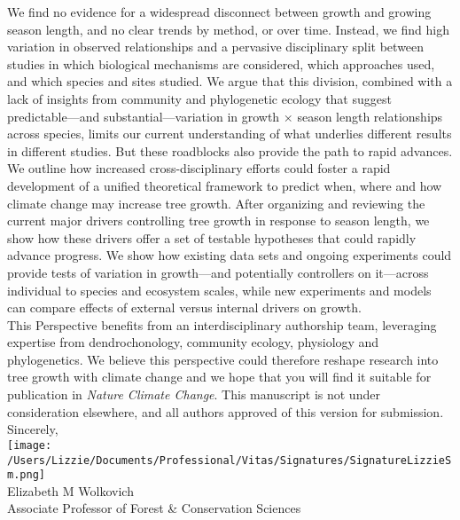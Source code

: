 \documentclass[11pt,a4paper]{article}
\begin{document}
We find no evidence for a widespread disconnect between growth and growing season length, and no clear trends by method, or over time. Instead, we find high variation in observed relationships and a pervasive disciplinary split between studies in which biological mechanisms are considered, which approaches used, and which species and sites studied. We argue that this division, combined with a lack of insights from community and phylogenetic ecology that suggest predictable---and substantial---variation in growth $\times$ season length relationships across species, limits our current understanding of what underlies different results in different studies. But these roadblocks also provide the path to rapid advances. 
\vspace{1.5ex}\\
We outline how increased cross-disciplinary efforts could foster a rapid development of a unified theoretical framework to predict when, where and how climate change may increase tree growth. After organizing and reviewing the current major drivers controlling tree growth in response to season length, we show how these drivers offer a set of testable hypotheses that could rapidly advance progress. We show how existing data sets and ongoing experiments could provide tests of variation in growth---and potentially controllers on it---across individual to species and ecosystem scales, while new experiments and models can compare effects of external versus internal drivers on growth. 
\vspace{1.5ex}\\
This Perspective benefits from an interdisciplinary authorship team, leveraging expertise from dendrochonology, community ecology, physiology and phylogenetics. We believe this perspective could therefore reshape research into tree growth with climate change and we hope that you will find it suitable for publication in \emph{Nature Climate Change}. This manuscript is not under consideration elsewhere, and all authors approved of this version for submission. 
\vspace{1.5ex}\\
Sincerely,\\

\texttt{[image: /Users/Lizzie/Documents/Professional/Vitas/Signatures/SignatureLizzieSm.png]} \\

\noindent Elizabeth M Wolkovich\\
Associate Professor of Forest \& Conservation Sciences\\ 

\newpage

\end{document}
